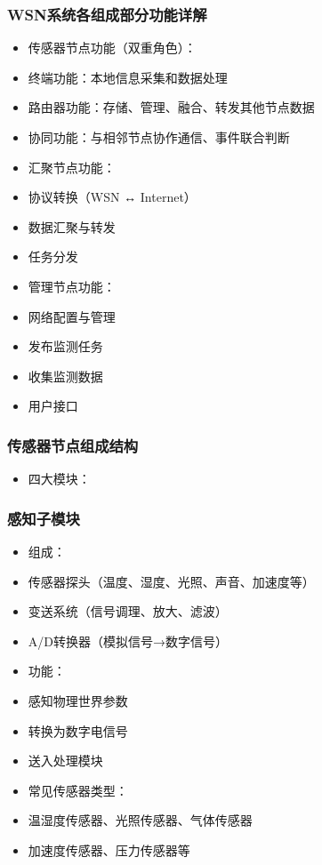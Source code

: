 \documentclass[aspectratio=43]{beamer}
\begin{document}
\begin{frame}
  \frametitle{WSN系统各组成部分功能详解}

  \begin{itemize}
  \item<+-> 传感器节点功能（双重角色）：
  \item<+-> 终端功能：本地信息采集和数据处理
  \item<+-> 路由器功能：存储、管理、融合、转发其他节点数据
  \item<+-> 协同功能：与相邻节点协作通信、事件联合判断
  \item<+-> 汇聚节点功能：
  \item<+-> 协议转换（WSN ↔ Internet）
  \item<+-> 数据汇聚与转发
  \item<+-> 任务分发
  \item<+-> 管理节点功能：
  \item<+-> 网络配置与管理
  \item<+-> 发布监测任务
  \item<+-> 收集监测数据
  \item<+-> 用户接口
  \end{itemize}
\end{frame}

\begin{frame}
  \frametitle{传感器节点组成结构}

  \begin{itemize}
  \item<+-> 四大模块：
  \end{itemize}
\end{frame}

\begin{frame}
  \frametitle{感知子模块}

  \begin{itemize}
  \item<+-> 组成：
  \item<+-> 传感器探头（温度、湿度、光照、声音、加速度等）
  \item<+-> 变送系统（信号调理、放大、滤波）
  \item<+-> A/D转换器（模拟信号→数字信号）
  \item<+-> 功能：
  \item<+-> 感知物理世界参数
  \item<+-> 转换为数字电信号
  \item<+-> 送入处理模块
  \item<+-> 常见传感器类型：
  \item<+-> 温湿度传感器、光照传感器、气体传感器
  \item<+-> 加速度传感器、压力传感器等
  \end{itemize}
\end{frame}
\end{document}
